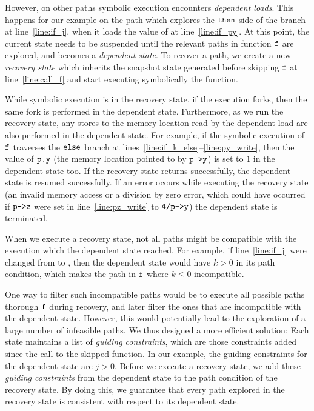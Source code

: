 However, on other paths symbolic execution encounters
\textit{dependent loads}.  This happens for our example on the path
which explores the $\texttt{then}$ side of the branch at
line~\ref{line:if_j}, when it loads the value of  at
line~\ref{line:if_py}. At this point, the current state needs to be
suspended until the relevant paths in function $\texttt{f}$ are
explored, and becomes a \textit{dependent state}. To recover a path,
we create a new \textit{recovery state} which inherits the snapshot
state generated before skipping $\texttt{f}$ at line~\ref{line:call_f}
and start executing symbolically the function.

While symbolic execution is in the recovery state, if the execution
forks, then the same fork is performed in the dependent state.
Furthermore, as we run the recovery state, any stores to the memory
location read by the dependent load are also performed in the
dependent state. For example, if the symbolic execution of $\texttt{f}$
traverses the $\texttt{else}$ branch at
lines~\ref{line:if_k_else}--\ref{line:py_write}, then the value of
$\texttt{p.y}$ (the memory location pointed to by $\texttt{p->y}$) is set
to $1$ in the dependent state too. If the recovery state returns
successfully, the dependent state is resumed successfully. If an error
occurs while executing the recovery state (\eg an invalid memory
access or a division by zero error, which could have occurred if
$\texttt{p->z}$ were set in line~\ref{line:pz_write} to $\texttt{4/p->y}$)
the dependent state is terminated.

When we execute a recovery state, not all paths might be compatible
with the execution which the dependent state reached. For example, if
line~\ref{line:if_j} were changed from  to , then the dependent state would have $k>0$ in its path condition, 
which makes the path in $\texttt{f}$ where $k \le 0$ incompatible.

One way to filter such incompatible paths would be to execute all
possible paths thorough $\texttt{f}$ during recovery, and later filter
the ones that are incompatible with the dependent state. However, this
would potentially lead to the exploration of a large number of
infeasible paths. We thus designed a more efficient solution: Each
state maintains a list of \textit{guiding constraints}, which are
those constraints added since the call to the skipped function. In our
example, the guiding constraints for the dependent state are
$j>0$. Before we execute a recovery state, we add these
\textit{guiding constraints} from the dependent state to the path
condition of the recovery state. By doing this, we guarantee that
every path explored in the recovery state is consistent with respect
to its dependent state.

